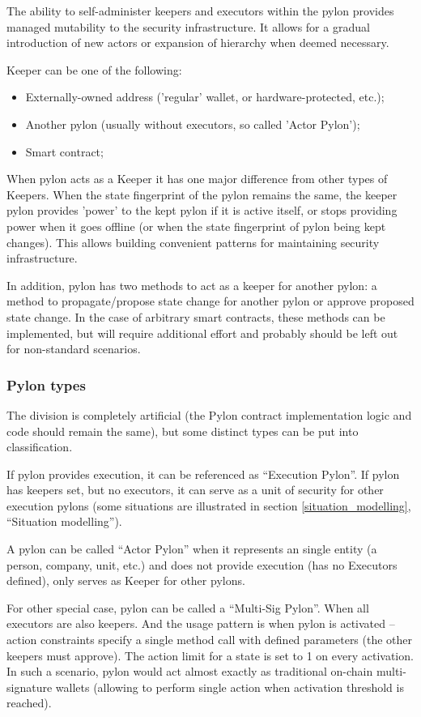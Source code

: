 \documentclass[12pt]{article}
\begin{document}
The ability to self-administer keepers and executors within the pylon provides managed mutability to the security infrastructure. It allows for a gradual introduction of new actors or expansion of hierarchy when deemed necessary.

Keeper can be one of the following:
\begin{itemize}
\item{Externally-owned address ('regular' wallet, or hardware-protected, etc.);}
\item{Another pylon (usually without executors, so called 'Actor Pylon');}
\item{Smart contract;}
\end{itemize}

When pylon acts as a Keeper it has one major difference from other types of Keepers. When the state fingerprint of the pylon remains the same, the keeper pylon provides 'power' to the kept pylon if it is active itself, or stops providing power when it goes offline (or when the state fingerprint of pylon being kept changes). This allows building convenient patterns for maintaining security infrastructure.

In addition, pylon has two methods to act as a keeper for another pylon: a method to propagate/propose state change for another pylon or approve proposed state change. In the case of arbitrary smart contracts, these methods can be implemented, but will require additional effort and probably should be left out for non-standard scenarios.

\subsubsection{Pylon types}

The division is completely artificial (the Pylon contract implementation logic and code should remain the same), but some distinct types can be put into classification.

If pylon provides execution, it can be referenced as ``Execution Pylon''. If pylon has keepers set, but no executors, it can serve as a unit of security for other execution pylons (some situations are illustrated in section \ref{situation_modelling}, ``Situation modelling'').

A pylon can be called ``Actor Pylon'' when it represents an single entity (a person, company, unit, etc.) and does not provide execution (has no Executors defined), only serves as Keeper for other pylons.

For other special case, pylon can be called a ``Multi-Sig Pylon''. When all executors are also keepers. And the usage pattern is when pylon is activated -- action constraints specify a single method call with defined parameters (the other keepers must approve). The action limit for a state is set to 1 on every activation. In such a scenario, pylon would act almost exactly as traditional on-chain multi-signature wallets (allowing to perform single action when activation threshold is reached).
\end{document}
